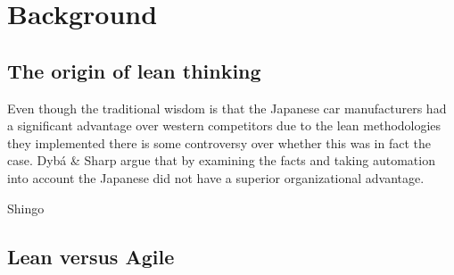 
\chapter{Background}
\label{chapter:background}


\section{The origin of lean thinking}
\label{section:leanorigins}



Even though the traditional wisdom is that the Japanese car manufacturers had a significant advantage over western competitors due to the lean methodologies they implemented there is some controversy over whether this was in fact the case. Dybá \& Sharp argue that by examining the facts and taking automation into account the Japanese did not have a superior organizational advantage. \cite{Dyba2012WhatS}

Shingo \cite{Shingo1989Study}

\section{Lean versus Agile}
\label{section:leanvsagile}


